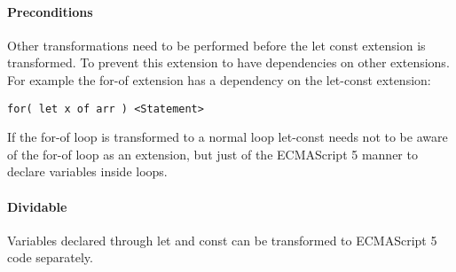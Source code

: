 \paragraph{Preconditions}
Other transformations need to be performed before the let const extension is transformed. To prevent this extension to have dependencies on other extensions. For example the for-of extension has a dependency on the let-const extension:

\begin{lstlisting}
for( let x of arr ) <Statement>
\end{lstlisting}

If the for-of loop is transformed to a normal loop let-const needs not to be aware of the for-of loop as an extension, but just of the ECMAScript 5 manner to declare variables inside loops.

\paragraph{Dividable}
Variables declared through let and const can be transformed to ECMAScript 5 code separately.